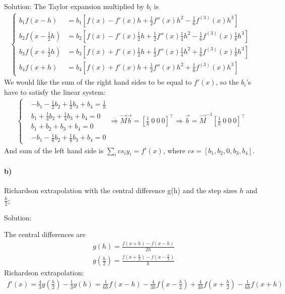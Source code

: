 \documentclass[11pt,a4paper,hidelinks,fleqn]{article}            %
\begin{document}
Solution:
The Taylor expansion multiplied by $b_i$ is
\begin{align*}
\begin{cases}
b_1 f(x - h) & = b_1 [f(x) - f'(x)h + \frac12 f''(x)h^2 - \frac16 f^{(3)}(x)h^3] \\
b_2 f(x - \frac12 h) & = b_2 [f(x) - f'(x) \frac12 h + \frac12 f''(x) \frac14 h^2 - \frac16 f^{(3)}(x)\frac18 h^3] \\
b_3 f(x + \frac12 h) & = b_3 [f(x) + f'(x) \frac12 h + \frac12 f''(x) \frac14 h^2 + \frac16 f^{(3)}(x) \frac18 h^3] \\
b_4 f(x + h) & = b_4 [f(x) + f'(x)h + \frac12 f''(x)h^2 + \frac16 f^{(3)}(x)h^3]
\end{cases}
\end{align*}
We would like the sum of the right hand sides to be equal to $f'(x)$, 
so the $b_i$'s have to satisfy the linear system:
\begin{align*}
\begin{cases}
& -b_1 - \frac12 b_2   + \frac12 b_3 + b_4 = \frac1h \\
& b_1  + \frac14 b_2  + \frac14 b_3 + b_4 = 0   \\
& b_1  + b_2      + b_3     + b_4 = 0   \\
& -b_1 - \frac18 b_2  + \frac18 b_3 + b_4 = 0   
\end{cases} 
\Rightarrow  \vec{M} \vec{b} = \left[\frac1h\ 0\ 0\ 0 \right]^{\top}
\Rightarrow  \vec{b} = \vec{M}^{-1}\left[\frac1h\ 0\ 0\ 0 \right]^{\top}
\end{align*}
And sum of the left hand side is $\sum_i cs_i y_i = f'(x)$, where $cs = [b_1, b_2, 0, b_3, b_4] $.


\paragraph{b)} Richardson extrapolation with the central difference g(h) and the step sizes $h$ and $\displaystyle \frac{h}{2}$; 

Solution:

The central differences are
\begin{align*}
& g(h) = \frac{f(x+h) - f(x-h)}{2h} \\
& g\left(\frac{h}{2}\right) = \frac{f(x+\frac h 2) - f(x-\frac h 2)}{h}
\end{align*}
Richardson extrapolation:
\begin{align*}
f'(x) = \frac43 g\left(\frac{h}{2}\right) - \frac13 g(h) = \frac1{6h} f(x-h) - \frac{4}{3h} f(x-\frac{h}2) + \frac{4}{3h} f(x+\frac{h}2) - \frac1{6h} f(x+h)
\end{align*}
\end{document}

